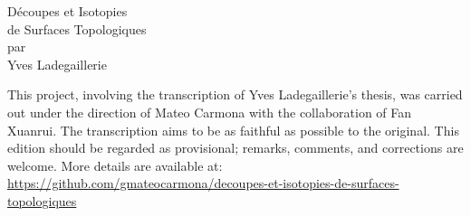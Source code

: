 \documentclass[12pt,twoside]{report} %
\begin{document}
\setcounter{tocdepth}{2}
\sloppy


\thispagestyle{empty}
\noindent\makebox[\linewidth]{\rule{4in}{0.01in}}
\vspace*{\fill}
\begin{center}
    {\Huge Découpes et Isotopies} \\
    \vspace{0.5em}
    {\Huge de Surfaces Topologiques} \\
    \vspace{0.5em}
    {\Large par} \\
    \vspace{0.5em}
    {\huge Yves Ladegaillerie}
\end{center}
\vspace*{\fill}
\noindent\makebox[\linewidth]{\rule{4in}{0.01in}}

\newpage 
\thispagestyle{empty}

\null\vfill
\noindent\begin{minipage}{\textwidth}
This project, involving the transcription of Yves Ladegaillerie's thesis, was carried out under the direction of Mateo Carmona with the collaboration of Fan Xuanrui. The transcription aims to be as faithful as possible to the original. This edition should be regarded as provisional; remarks, comments, and corrections are welcome. More details are available at: \url{https://github.com/gmateocarmona/decoupes-et-isotopies-de-surfaces-topologiques}
\end{minipage}

\newpage
\end{document}
